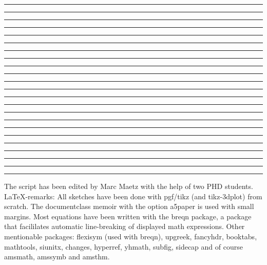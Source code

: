 \documentclass[10pt]{memoir}
\begin{document}
\begin{multicols}{3}
\rule{\columnwidth}{11pt}
\rule{\columnwidth}{11pt}
\par
{}
\rule{\columnwidth}{11pt}
\rule{\columnwidth}{11pt}
\rule{\columnwidth}{11pt}
\par
{}
\rule{\columnwidth}{11pt}
\rule{\columnwidth}{11pt}
\rule{\columnwidth}{11pt}
\par
{}
\rule{\columnwidth}{11pt}
\rule{\columnwidth}{11pt}
\rule{\columnwidth}{11pt}
\par
{}
\rule{\columnwidth}{11pt}
\rule{\columnwidth}{11pt}
\rule{\columnwidth}{11pt}
\par
{}
\rule{\columnwidth}{11pt}
\rule{\columnwidth}{11pt}
\rule{\columnwidth}{11pt}
\par
{}
\rule{\columnwidth}{11pt}
\rule{\columnwidth}{11pt}
\rule{\columnwidth}{11pt}
\par
{}
\rule{\columnwidth}{11pt}
\rule{\columnwidth}{11pt}
\rule{\columnwidth}{11pt}
The script has been edited by Marc Maetz with the help of two PHD students. \LaTeX-remarks: All sketches have been done with pgf/tikz (and tikz-3dplot) from scratch. The documentclass memoir with the option a5paper is used with small margins. Most equations have been written with the breqn package, a package that facililates automatic line-breaking of displayed math expressions. Other mentionable packages: flexisym (used with breqn), upgreek, fancyhdr, booktabs, mathtools, siunitx, changes, hyperref, yhmath, subfig, sidecap and of course amsmath, amssymb and amsthm.

\end{multicols}
\end{document}
